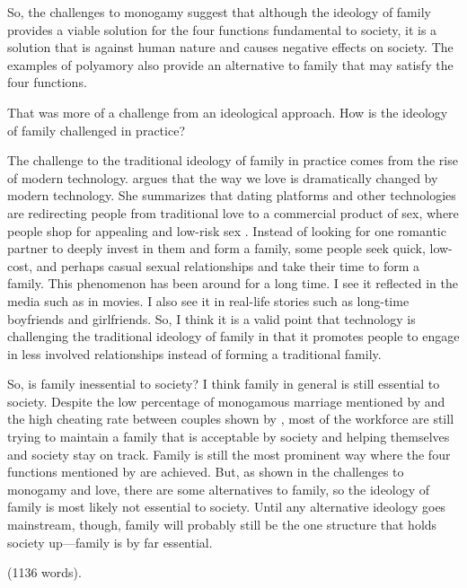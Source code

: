 \documentclass[12pt]{article}
\begin{document}
So, the challenges to monogamy suggest that although the ideology of family
provides a viable solution for the four functions fundamental to society,
it is a solution that is against human nature and
causes negative effects on society.
The examples of polyamory also provide an alternative to family that may
satisfy the four functions.

That was more of a challenge from an ideological approach.
How is the ideology of family challenged in practice?

The challenge to the traditional ideology of family in practice comes from
the rise of modern technology.
\citet{malinowska2022love} argues that the way we love is
dramatically changed by modern technology.
She summarizes that dating platforms and other technologies are redirecting
people from traditional love to a commercial product of sex,
where people shop for appealing and low-risk sex \citep{malinowska2022love}.
Instead of looking for one romantic partner to deeply invest in them and form a
family, some people seek quick, low-cost,
and perhaps casual sexual relationships and take their time to form a family.
This phenomenon has been around for a long time.
I see it reflected in the media such as in movies.
I also see it in real-life stories such as long-time boyfriends and girlfriends.
So, I think it is a valid point that technology is challenging the traditional
ideology of family in that it promotes people to engage in less involved
relationships instead of forming a traditional family.

So, is family inessential to society?
I think family in general is still essential to society.
Despite the low percentage of monogamous marriage mentioned by
\citet[p. 63]{gittins1993family} and the high cheating rate between couples
shown by \citet{fridman2023aella},
most of the workforce are still trying to maintain a family that is acceptable
by society and helping themselves and society stay on track.
Family is still the most prominent way where the four functions mentioned by
\citet[p. 60]{gittins1993family} are achieved.
But, as shown in the challenges to monogamy and love,
there are some alternatives to family,
so the ideology of family is most likely not essential to society.
Until any alternative ideology goes mainstream, though,
family will probably still be the one structure that holds society up—family
is by far essential.

(1136 words).
\pagebreak


\end{document}
